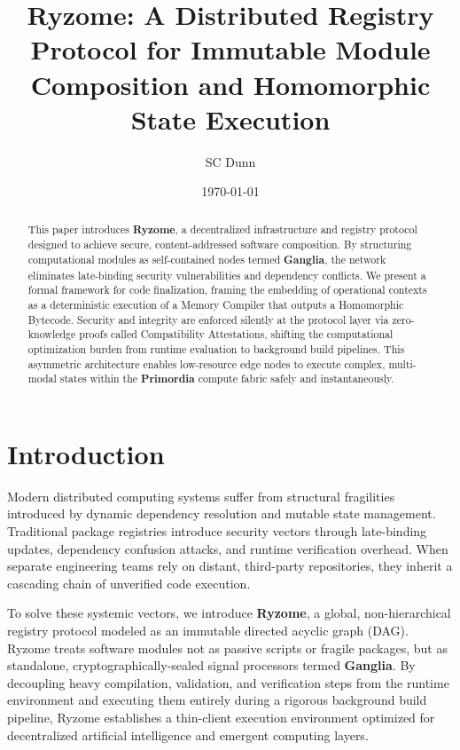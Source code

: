 \documentclass{article}
\title{Ryzome: A Distributed Registry Protocol for Immutable Module Composition and Homomorphic State Execution}
\author{SC Dunn}
\date{\today}
\begin{document}
\maketitle

\begin{abstract}
This paper introduces \textbf{Ryzome}, a decentralized infrastructure and registry protocol designed to achieve secure, content-addressed software composition. By structuring computational modules as self-contained nodes termed \textbf{Ganglia}, the network eliminates late-binding security vulnerabilities and dependency conflicts. We present a formal framework for code finalization, framing the embedding of operational contexts as a deterministic execution of a Memory Compiler that outputs a Homomorphic Bytecode. Security and integrity are enforced silently at the protocol layer via zero-knowledge proofs called Compatibility Attestations, shifting the computational optimization burden from runtime evaluation to background build pipelines. This asymmetric architecture enables low-resource edge nodes to execute complex, multi-modal states within the \textbf{Primordia} compute fabric safely and instantaneously.
\end{abstract}

\section{Introduction}
Modern distributed computing systems suffer from structural fragilities introduced by dynamic dependency resolution and mutable state management. Traditional package registries introduce security vectors through late-binding updates, dependency confusion attacks, and runtime verification overhead. When separate engineering teams rely on distant, third-party repositories, they inherit a cascading chain of unverified code execution. 

To solve these systemic vectors, we introduce \textbf{Ryzome}, a global, non-hierarchical registry protocol modeled as an immutable directed acyclic graph (DAG). Ryzome treats software modules not as passive scripts or fragile packages, but as standalone, cryptographically-sealed signal processors termed \textbf{Ganglia}. By decoupling heavy compilation, validation, and verification steps from the runtime environment and executing them entirely during a rigorous background build pipeline, Ryzome establishes a thin-client execution environment optimized for decentralized artificial intelligence and emergent computing layers.
\end{document}
